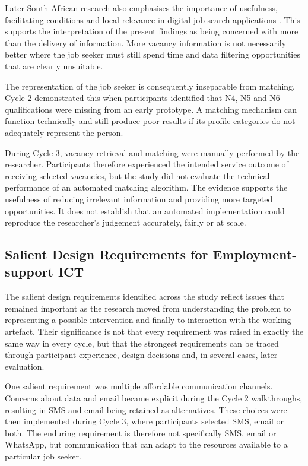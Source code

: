 Later South African research also emphasises the importance of usefulness, facilitating conditions and local relevance in digital job search applications \cite{mangadi2024}. This supports the interpretation of the present findings as being concerned with more than the delivery of information. More vacancy information is not necessarily better where the job seeker must still spend time and data filtering opportunities that are clearly unsuitable.

The representation of the job seeker is consequently inseparable from matching. Cycle 2 demonstrated this when participants identified that N4, N5 and N6 qualifications were missing from an early prototype. A matching mechanism can function technically and still produce poor results if its profile categories do not adequately represent the person.

During Cycle 3, vacancy retrieval and matching were manually performed by the researcher. Participants therefore experienced the intended service outcome of receiving selected vacancies, but the study did not evaluate the technical performance of an automated matching algorithm. The evidence supports the usefulness of reducing irrelevant information and providing more targeted opportunities. It does not establish that an automated implementation could reproduce the researcher's judgement accurately, fairly or at scale.


\subsection{Salient Design Requirements for Employment-support ICT}

The salient design requirements identified across the study reflect issues that remained important as the research moved from understanding the problem to representing a possible intervention and finally to interaction with the working artefact. Their significance is not that every requirement was raised in exactly the same way in every cycle, but that the strongest requirements can be traced through participant experience, design decisions and, in several cases, later evaluation.

One salient requirement was multiple affordable communication channels. Concerns about data and email became explicit during the Cycle 2 walkthroughs, resulting in SMS and email being retained as alternatives. These choices were then implemented during Cycle 3, where participants selected SMS, email or both. The enduring requirement is therefore not specifically SMS, email or WhatsApp, but communication that can adapt to the resources available to a particular job seeker.

